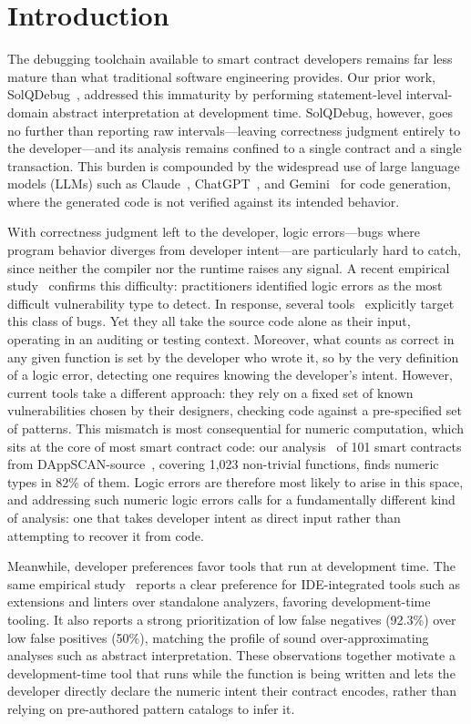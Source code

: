 \documentclass[pdflatex,sn-basic]{sn-jnl}%
\theoremstyle{thmstyleone}%
\theoremstyle{thmstyletwo}%
\theoremstyle{thmstylethree}%
\begin{document}
\section{Introduction}

The debugging toolchain available to smart contract developers remains far less mature than what traditional software engineering provides.
Our prior work, SolQDebug~\citep{solqdebug}, addressed this immaturity by performing statement-level interval-domain abstract interpretation at development time.
SolQDebug, however, goes no further than reporting raw intervals---leaving correctness judgment entirely to the developer---and its analysis remains confined to a single contract and a single transaction.
This burden is compounded by the widespread use of large language models (LLMs) such as Claude~\citep{claude}, ChatGPT~\citep{chatgpt}, and Gemini~\citep{gemini} for code generation, where the generated code is not verified against its intended behavior.

With correctness judgment left to the developer, logic errors---bugs where program behavior diverges from developer intent---are particularly hard to catch, since neither the compiler nor the runtime raises any signal.
A recent empirical study~\citep{defisecurity} confirms this difficulty: practitioners identified logic errors as the most difficult vulnerability type to detect.
In response, several tools~\citep{numscout, gptscan, sctype} explicitly target this class of bugs.
Yet they all take the source code alone as their input, operating in an auditing or testing context.
Moreover, what counts as correct in any given function is set by the developer who wrote it, so by the very definition of a logic error, detecting one requires knowing the developer's intent.
However, current tools take a different approach: they rely on a fixed set of known vulnerabilities chosen by their designers, checking code against a pre-specified set of patterns.
This mismatch is most consequential for numeric computation, which sits at the core of most smart contract code: our analysis~\citep{dappscananalysis} of 101 smart contracts from DAppSCAN-source~\citep{dappscan}, covering 1,023 non-trivial functions, finds numeric types in 82\% of them.
Logic errors are therefore most likely to arise in this space, and addressing such numeric logic errors calls for a fundamentally different kind of analysis: one that takes developer intent as direct input rather than attempting to recover it from code.

Meanwhile, developer preferences favor tools that run at development time. The same empirical study~\citep{defisecurity} reports a clear preference for IDE-integrated tools such as extensions and linters over standalone analyzers, favoring development-time tooling. It also reports a strong prioritization of low false negatives (92.3\%) over low false positives (50\%), matching the profile of sound over-approximating analyses such as abstract interpretation.
These observations together motivate a development-time tool that runs while the function is being written and lets the developer directly declare the numeric intent their contract encodes, rather than relying on pre-authored pattern catalogs to infer it.
\end{document}
